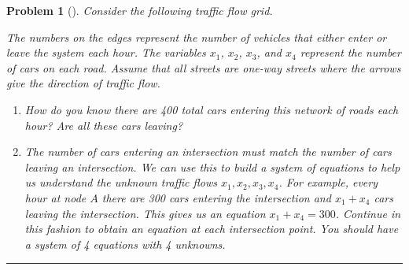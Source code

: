 \documentclass[letterpaper,oneside]{book}%
\newcommand{\midarrow}{\tikz \draw[-triangle 90] (0,0) -- +(.1,0);}
\theoremstyle{plain}
\theoremstyle{box}
\theoremstyle{problem}
\newtheorem{problemnum}{Problem}[chapter]
\newenvironment{problem}[1][]{\begin{problemnum}[#1]}{\end{problemnum}\nopagebreak\hrule\bigskip}
\begin{document}
\begin{problem}
Consider the following traffic flow grid.
\begin{center}
\end{center}
The numbers on the edges represent the number of vehicles that either enter or leave the system each hour.  The variables $x_1$, $x_2$, $x_3$, and $x_4$ represent the number of cars on each road. Assume that all streets are one-way streets where the arrows give the direction of traffic flow.
\begin{enumerate}
 \item How do you know there are 400 total cars entering this network of roads each hour? Are all these cars leaving?
 \item The number of cars entering an intersection must match the number of cars leaving an intersection.  We can use this to build a system of equations to help us understand the unknown traffic flows $x_1, x_2,x_3, x_4$.  For example, every hour at node $A$ there are 300 cars entering the intersection and $x_1+x_4$ cars leaving the intersection. This gives us an equation $x_1+x_4=300$. Continue in this fashion to obtain an equation at each intersection point. You should have a system of 4 equations with 4 unknowns.

\end{enumerate}
\end{problem}
\end{document}
